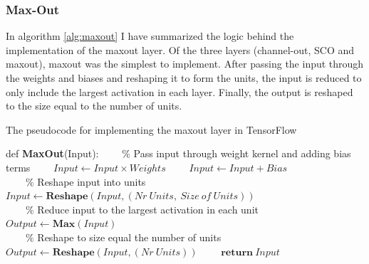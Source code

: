 \subsubsection*{Max-Out}
In algorithm \ref{alg:maxout} I have summarized the logic behind the implementation of the maxout layer.
Of the three layers (channel-out, \ac{SCO} and maxout), maxout was the simplest to implement. After passing 
the input through the weights and biases and reshaping it to form the units, the input is reduced to only include 
the largest activation in each layer. Finally, the output is reshaped to the size equal to the number of units.
\begin{algorithm}
    \caption{The pseudocode for implementing the maxout layer in TensorFlow}\label{alg:maxout}
    \begin{algorithmic}[1]
    \State def \textbf{MaxOut}(Input): 
    \State \ \ \ \ $\%$ Pass input through weight kernel and adding bias terms
    \State \ \ \ \ $Input \gets Input \times Weights$
    \State \ \ \ \ $Input \gets Input + Bias$
    \\
    \State \ \ \ \ $\%$ Reshape input into units
    \State \ \ \ \ $Input \gets \textbf{Reshape}(Input,(Nr\ Units,\ Size \ of \ Units))$
    \\
    \State \ \ \ \ $\%$ Reduce input to the largest activation in each unit
    \State \ \ \ \ $Output \gets \textbf{Max}(Input)$
    \\
    \State \ \ \ \ $\%$ Reshape to size equal the number of units
    \State \ \ \ \ $Output \gets \textbf{Reshape}(Input,(Nr \ Units))$
    \State \ \ \ \ $\textbf{return}\ Input$
    \end{algorithmic}
\end{algorithm}
